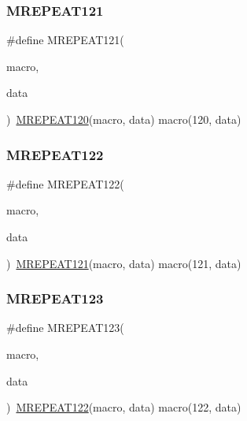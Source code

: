 \mbox{\label{group__group__sam0__utils__mrepeat_ga75b16de882e5c30c0126c306e09d65c1}} 
\subsubsection{\texorpdfstring{MREPEAT121}{MREPEAT121}}
{\footnotesize\ttfamily \#define M\+R\+E\+P\+E\+A\+T121(\begin{DoxyParamCaption}\item[{}]{macro,  }\item[{}]{data }\end{DoxyParamCaption})~\mbox{\hyperlink{group__group__sam0__utils__mrepeat_ga4a67c3aed21abce662b2668e10a50d4b}{M\+R\+E\+P\+E\+A\+T120}}(macro, data)   macro(120, data)}

\mbox{\label{group__group__sam0__utils__mrepeat_ga002c52a2af11a3a25a748ab09f16a8f5}} 
\subsubsection{\texorpdfstring{MREPEAT122}{MREPEAT122}}
{\footnotesize\ttfamily \#define M\+R\+E\+P\+E\+A\+T122(\begin{DoxyParamCaption}\item[{}]{macro,  }\item[{}]{data }\end{DoxyParamCaption})~\mbox{\hyperlink{group__group__sam0__utils__mrepeat_ga75b16de882e5c30c0126c306e09d65c1}{M\+R\+E\+P\+E\+A\+T121}}(macro, data)   macro(121, data)}

\mbox{\label{group__group__sam0__utils__mrepeat_gaf0802f3653fa2845f482ec6a119d9260}} 
\subsubsection{\texorpdfstring{MREPEAT123}{MREPEAT123}}
{\footnotesize\ttfamily \#define M\+R\+E\+P\+E\+A\+T123(\begin{DoxyParamCaption}\item[{}]{macro,  }\item[{}]{data }\end{DoxyParamCaption})~\mbox{\hyperlink{group__group__sam0__utils__mrepeat_ga002c52a2af11a3a25a748ab09f16a8f5}{M\+R\+E\+P\+E\+A\+T122}}(macro, data)   macro(122, data)}

